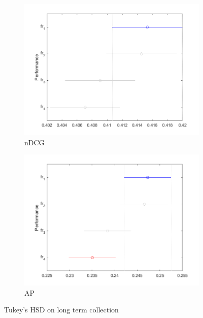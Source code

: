 \begin{figure}[tbp]
     \centering
     \begin{subfigure}[b]{0.4\textwidth}
         \centering
         \includegraphics[width=\textwidth]{figure/long-ndcg-hsd.png}
	\caption{\ac{nDCG}}
     \end{subfigure}
     \hfill
     \begin{subfigure}[b]{0.4\textwidth}
         \centering
         \includegraphics[width=\textwidth]{figure/long-map-hsd.png}
	\caption{\ac{AP}}
     \end{subfigure}
        \caption{Tukey's \ac{HSD} on long term collection}
        \label{fig:long-hsd}
\end{figure}
